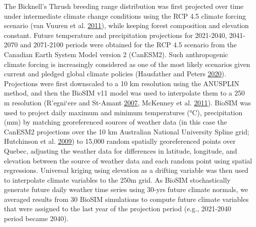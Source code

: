\documentclass[12pt]{article}
\begin{document}
The Bicknell's Thrush breeding range distribution was first projected
over time under intermediate climate change conditions using the RCP 4.5
climate forcing scenario (van Vuuren et al.
\protect\hyperlink{ref-van_vuuren_representative_2011}{2011}), while
keeping forest composition and elevation constant. Future temperature
and precipitation projections for 2021-2040, 2041-2070 and 2071-2100
periods were obtained for the RCP 4.5 scenario from the Canadian Earth
System Model version 2 (CanESM2). Such anthropogenic climate forcing is
increasingly considered as one of the most likely scenarios given
current and pledged global climate policies (Hausfather and Peters
\protect\hyperlink{ref-hausfather_emissions_2020}{2020}). Projections
were first downscaled to a 10 km resolution using the ANUSPLIN method,
and then the BioSIM v11 model was used to interpolate them to a 250 m
resolution (R\a'egni\a`ere and St-Amant
\protect\hyperlink{ref-regniere_stochastic_2007}{2007}, McKenney et al.
\protect\hyperlink{ref-mckenney_customized_2011}{2011}). BioSIM was used
to project daily maximum and minimum temperatures (°C), precipitation
(mm) by matching georeferenced sources of weather data (in this case the
CanESM2 projections over the 10 km Australian National University Spline
grid; Hutchinson et al.
\protect\hyperlink{ref-hutchinson_development_2009}{2009}) to 15,000
random spatially georeferenced points over Quebec, adjusting the weather
data for differences in latitude, longitude, and elevation between the
source of weather data and each random point using spatial regressions.
Universal kriging using elevation as a drifting variable was then used
to interpolate climate variables to the 250m grid. As BioSIM
stochastically generate future daily weather time series using 30-yrs
future climate normals, we averaged results from 30 BioSIM simulations
to compute future climate variables that were assigned to the last year
of the projection period (e.g., 2021-2040 period became 2040).
\end{document}
